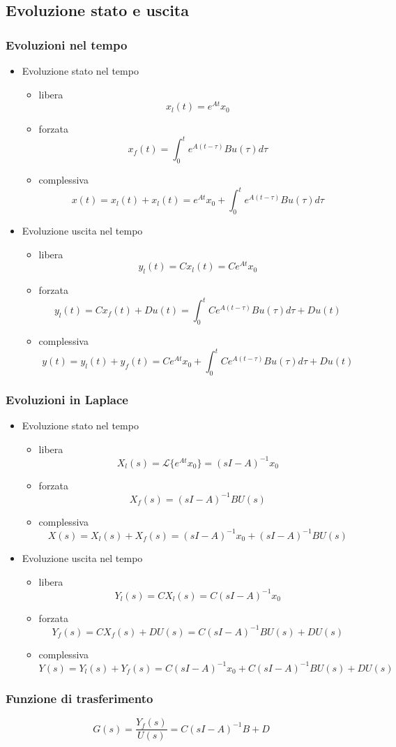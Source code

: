 \documentclass[11pt]{article}
\begin{document}
\subsection{Evoluzione stato e uscita}
\label{sec:orgfd1d506}
\subsubsection{Evoluzioni nel tempo}
\label{sec:orgb4d76c9}
\begin{itemize}
\item Evoluzione stato nel tempo
\begin{itemize}
\item libera
\[x_l (t) = e^{At} x_0\]
\item forzata
\[x_f (t) = \int_{0}^{t} e^{A(t-\tau)} Bu(\tau) d \tau\]
\item complessiva
\[ x(t) = x_l (t) + x_l (t) =
	    e^{At} x_0 + \int_{0}^{t} e^{A(t-\tau)} Bu(\tau) d \tau \]
\end{itemize}

\item Evoluzione uscita nel tempo
\begin{itemize}
\item libera
\[y_l (t) = C x_l (t) = Ce^{At} x_0\]
\item forzata
\[y_l (t) = C x_f (t) + D u(t) =
	    \int_{0}^{t} C e^{A(t-\tau)} Bu(\tau) d \tau + D u(t) \]
\item complessiva
\[y(t) = y_l (t) + y_f (t) = C e^{At} x_0 +
	    \int_{0}^{t} C e^{A(t-\tau)} Bu(\tau) d \tau + D u(t) \]
\end{itemize}
\end{itemize}
\subsubsection{Evoluzioni in Laplace}
\label{sec:orgedad21f}
\begin{itemize}
\item Evoluzione stato nel tempo
\begin{itemize}
\item libera
\[X_l (s) = \mathcal{L} \{e^{At} x_0\} = (sI - A)^{-1} x_0\]
\item forzata
\[X_f (s) = (sI - A)^{-1} BU(s)\]
\item complessiva
\[X(s) = X_l (s) + X_f (s) =
	    (sI - A)^{-1} x_0 + (sI - A)^{-1} BU(s) \]
\end{itemize}

\item Evoluzione uscita nel tempo
\begin{itemize}
\item libera
\[Y_l (s) = C X_l (s) = C(sI - A)^{-1} x_0\]
\item forzata
\[Y_f (s) = C X_f (s) + D U(s) = C(sI - A)^{-1} BU(s) + DU(s)\]
\item complessiva
\[Y(s) = Y_l (s) + Y_f (s) =
	    C(sI - A)^{-1} x_0 + C(sI - A)^{-1} BU(s) + DU(s) \]
\end{itemize}
\end{itemize}

\subsubsection{Funzione di trasferimento}
\label{sec:org8c89da3}
\[G(s) = \frac{Y_f(s)}{U(s)} = C(sI-A)^{-1}B + D\]
\end{document}
